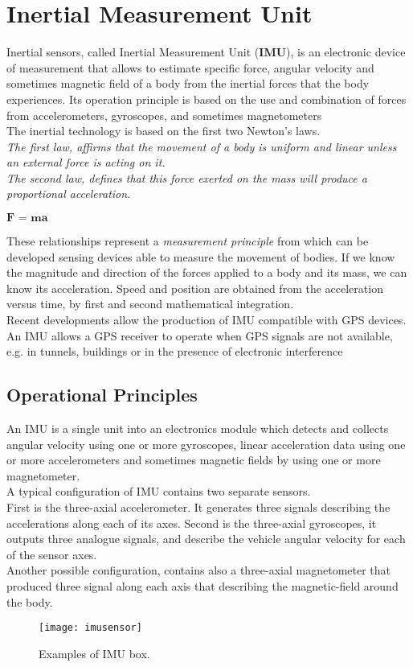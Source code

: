 \documentclass{standalone}
\begin{document}
\chapter{Inertial Measurement Unit}
\label{Inertial Measurement Unit}
Inertial sensors, called Inertial Measurement Unit (\textbf{IMU}), is an electronic device of measurement that allows to estimate specific force, angular velocity and sometimes magnetic field of a body from the inertial forces that the body experiences. Its operation principle is based on the use and combination of forces from accelerometers, gyroscopes, and sometimes magnetometers\\
\noindent The inertial technology is based on the first two Newton’s laws. \\
\textit{The first law, affirms that the movement of a body is uniform and linear unless an external force is acting on it.} \\
\textit{The second law, defines that this force exerted on the mass will produce a proportional acceleration.
} 
\begin{center}
$ \textbf{F = ma} $
\end{center}

\noindent These relationships represent a \textit{measurement principle} from which can be developed sensing devices  able to measure the movement of bodies.
If we know the magnitude and direction of the forces applied to a body and its mass, we can know its acceleration. Speed and position are obtained from the acceleration versus time, by first and second mathematical integration.\\
Recent developments allow the production of IMU compatible with GPS devices. An IMU allows a GPS receiver to operate when GPS signals are not available, e.g. in tunnels, buildings or in the presence of electronic interference\cite{gpssystem} 
\newpage
\section{Operational Principles}\label{Operational Principles}
An IMU is a single unit into an electronics module which detects and collects angular velocity using one or more gyroscopes, linear acceleration data using one or more accelerometers and sometimes magnetic fields by using one or more magnetometer.\\
A typical configuration of IMU contains two separate sensors. \\First is the three-axial accelerometer. It 
generates three signals describing the accelerations along each of its axes. Second is the three-axial gyroscopes, it  outputs three analogue signals, and describe the vehicle angular velocity for each of the sensor axes.\\ Another possible configuration, contains also a three-axial magnetometer that produced three signal along each axis that describing the magnetic-field around the body.
\begin{center}
\begin{figure}[h]
\centering
\texttt{[image: imusensor]}
\caption{Examples of IMU box.}
\label{fig:IMU box}
\end{figure}
\end{center}
\clearpage
\end{document}
